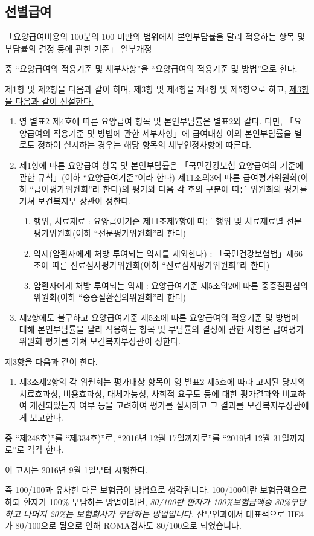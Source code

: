 \subsection{선별급여}
「요양급여비용의 100분의 100 미만의 범위에서 본인부담률을 달리 적용하는 항목 및 부담률의 결정 등에 관한 기준」 일부개정\par
\begin{description}\tightlist	
\item[제1조] 중 “요양급여의 적용기준 및 세부사항”을 “요양급여의 적용기준 및 방법”으로 한다.
\item[제3조] 제1항 및 제2항을 다음과 같이 하며, 제3항 및 제4항을 제4항 및 제5항으로 하고, \uline{제3항을 다음과 같이 신설한다.} 
	\begin{enumerate}[①]\tightlist
	\item 영 별표2 제4호에 따른 요양급여 항목 및 본인부담률은 별표2와 같다. 다만, 「요양급여의 적용기준 및 방법에 관한 세부사항」에 급여대상 이외 본인부담률을 별로도 정하여 실시하는 경우는 해당 항목의 세부인정사항에 따른다. 
	\item 제1항에 따른 요양급여 항목 및 본인부담률은 「국민건강보험 요양급여의 기준에 관한 규칙」(이하 “요양급여기준”이라 한다) 제11조의3에 따른 급여평가위원회(이하 “급여평가위원회”라 한다)의 평가와 다음 각 호의 구분에 따른 위원회의 평가를 거쳐 보건복지부 장관이 정한다. 
		\begin{enumerate}[1.]\tightlist
		\item 행위, 치료재료 : 요양급여기준 제11조제7항에 따른 행위 및 치료재료별 전문평가위원회(이하 “전문평가위원회”라 한다)
		\item 약제(암환자에게 처방\cntrdot{} 투여되는 약제를 제외한다) : 「국민건강보험법」제66조에 따른 진료심사평가위원회(이하 “진료심사평가위원회”라 한다)
		\item 암환자에게 처방\cntrdot{} 투여되는 약제 : 요양급여기준 제5조의2에 따른 중증질환심의위원회(이하 “중증질환심의위원회”라 한다)
		\end{enumerate}
	\item 제2항에도 불구하고 요양급여기준 제5조에 따른 요양급여의 적용기준 및 방법에 대해 본인부담률을 달리 적용하는 항목 및 부담률의 결정에 관한 사항은 급여평가위원회 평가를 거쳐 보건복지부장관이 정한다. 
	\end{enumerate}
\item[제9조] 제3항을 다음과 같이 한다. 
	\begin{enumerate}[③]\tightlist
	\item 제3조제2항의 각 위원회는 평가대상 항목이 영 별표2 제5호에 따라 고시된 당시의 치료효과성, 비용효과성, 대체가능성, 사회적 요구도 등에 대한 평가결과와 비교하여 개선되었는지 여부 등을 고려하여 평가를 실시하고 그 결과를 보건복지부장관에게 보고한다. 
	\end{enumerate}
\item[제11조] 중 “제248호)”를 “제334호)”로, “2016년 12월 17일까지로”를 “2019년 12월 31일까지로”로 각각 한다. 
\end{description}
이 고시는 2016년 9월 1일부터 시행한다.\par
즉 100/100과 유사한 다른 보험급여 방법으로 생각됩니다. 100/100이란 보험급액으로 하되 환자가 100\% 부담하는 방법이라면, \emph{80/100란 환자가 100\%보험금액중 80\%부담하고 나머지 20\%는 보험회사가 부담하는 방법입니다.} 산부인과에서 대표적으로 HE4가 80/100으로 됨으로 인해 ROMA검사도 80/100으로 되었습니다.
